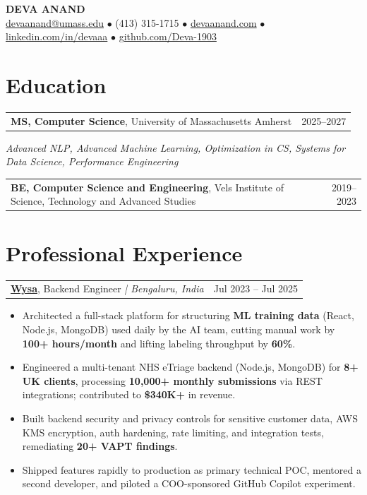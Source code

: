 \documentclass[letterpaper,11pt]{article}
\makeatletter
\newcommand{\eduItem}[3]{%
  \begin{tabular*}{\textwidth}{@{}l@{\extracolsep{\fill}}r@{}}
    \textbf{#1}, #2 & #3 \\
  \end{tabular*}\par
}
\newcommand{\expItem}[4]{%
  \vspace{3pt}
  \begin{tabular*}{\textwidth}{@{}l@{\extracolsep{\fill}}r@{}}
    \textbf{#1}, #2 \textit{| #3} & #4 \\
  \end{tabular*}\par\vspace{-2pt}
}
\makeatother
\begin{document}
\begin{center}
    {\fontsize{18}{20}\selectfont\bfseries DEVA ANAND}\\ \vspace{3pt}
    {\small
    \href{mailto:devaanand@umass.edu}{devaanand@umass.edu}
    \enspace$\bullet$\enspace
    (413) 315-1715
    \enspace$\bullet$\enspace
    \href{https://devaanand.com}{devaanand.com}
    \enspace$\bullet$\enspace
    \href{https://linkedin.com/in/devaaa/}{linkedin.com/in/devaaa}
    \enspace$\bullet$\enspace
    \href{https://github.com/Deva-1903}{github.com/Deva-1903}}
\end{center}
\vspace{-6pt}

\section{Education}
\eduItem{MS, Computer Science}{University of Massachusetts Amherst}{2025--2027}
{\small\textit{Advanced NLP, Advanced Machine Learning, Optimization in CS, Systems for Data Science, Performance Engineering}}\par
\vspace{3pt}
\eduItem{BE, Computer Science and Engineering}{Vels Institute of Science, Technology and Advanced Studies}{2019--2023}

\section{Professional Experience}

\expItem{\href{https://www.wysa.io}{Wysa}}{Backend Engineer}{Bengaluru, India}{Jul 2023 -- Jul 2025}
\begin{itemize}
  \item Architected a full-stack platform for structuring \textbf{ML training data} (React, Node.js, MongoDB) used daily by the AI team, cutting manual work by \textbf{100+ hours/month} and lifting labeling throughput by \textbf{60\%}.
  \item Engineered a multi-tenant NHS eTriage backend (Node.js, MongoDB) for \textbf{8+ UK clients}, processing \textbf{10{,}000+ monthly submissions} via REST integrations; contributed to \textbf{\$340K+} in revenue.
  \item Built backend security and privacy controls for sensitive customer data, AWS KMS encryption, auth hardening, rate limiting, and integration tests, remediating \textbf{20+ VAPT findings}.
  \item Shipped features rapidly to production as primary technical POC, mentored a second developer, and piloted a COO-sponsored GitHub Copilot experiment.
\end{itemize}
\end{document}
